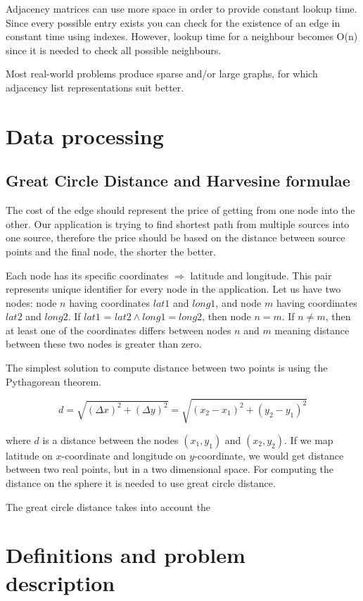 \documentclass[thesis=M,english]{FITthesis}[2012/10/20]
\begin{document}
Adjacency matrices can use more space in order to provide constant lookup time. Since every possible entry exists you can check for the existence of an edge in constant time using indexes. However, lookup time for a neighbour becomes O(n) since it is needed to check all possible neighbours.

Most real-world problems produce sparse and/or large graphs, for which adjacency list representations suit better.



\section{Data processing}

\subsection{Great Circle Distance and Harvesine formulae}
The cost of the edge should represent the price of getting from one node into the other. Our application is trying to find shortest path from multiple sources into one source, therefore the price should be based on the distance between source points and the final node, the shorter the better. 

Each node has its specific coordinates $\Rightarrow$ latitude and longitude. This pair represents unique identifier for every node in the application. Let us have two nodes: node $n$ having coordinates $lat1$ and $long1$, and node $m$ having coordinates $lat2$ and $long2$. If $lat1$ = $lat2 \wedge long1 = long2$, then node $n = m$. If $n \neq m$, then at least one of the coordinates differs between nodes $n$ and $m$ meaning distance between these two nodes is greater than zero.

The simplest solution to compute distance between two points is using the Pythagorean theorem.

$$
d = \sqrt{(\Delta x)^2 + (\Delta y)^2} = \sqrt{(x_2 - x_1 )^2 + (y_2 - y_1)^2}
$$

where $d$ is a distance between the nodes $(x_1, y_1)$ and $(x_2, y_2)$. If we map latitude on $x$-coordinate and longitude on $y$-coordinate, we would get distance between two real points, but in a two dimensional space. For computing the distance on the sphere it is needed to use great circle distance.

The great circle distance takes into account the 




\section{Definitions and problem description}
\end{document}
